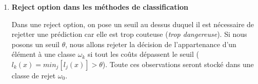 \documentclass[a4paper, 11pt, onecolumn]{article}
\begin{document}
\begin{enumerate}
\item \textbf{Reject option dans les méthodes de classification}

  Dans une reject option, on pose un seuil au dessus duquel il est nécessaire de rejetter une prédiction car elle est trop couteuse (\textit{trop dangereuse}). Si nous posons un seuil $\theta$, nous allons rejeter la décision de l'appartenance d'un élément à une classe $\omega_k$ si tout les coûts dépassent le seuil ($l_k(x) = min_j[l_j(x)] > \theta$). Toute ces observations seront stocké dans une classe de rejet $\omega_0$. 

\end{enumerate}
\end{document}
